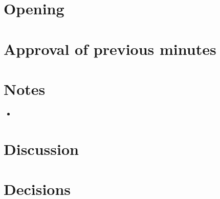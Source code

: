 \documentclass{article}
\newcommand{\meetingdate}{}
\newcommand{\meetingtime}{}
\newcommand{\meetingplace}{}
\newcommand{\meetingname}{}
\newcommand{\attendees}{}
\begin{document}
    \begin{titlepage}
        \settitle{\meetingname}
        \date{\meetingdate}
        \maketitle
        
        \thispagestyle{first}
        
        \timeanddate{\meetingdate \space \meetingtime}
        \place{\meetingplace}
        \called{\members}
        \attended{\attendees}
    \end{titlepage}
    \newpage
    \pagestyle{fancy}

    \section{Opening}

    \section{Approval of previous minutes}
        \approve{}


    \section{Notes}
        \begin{itemize}
            \item  
        \end{itemize}

    \section{Discussion}

        

    \section{Decisions}

    
\end{document}

